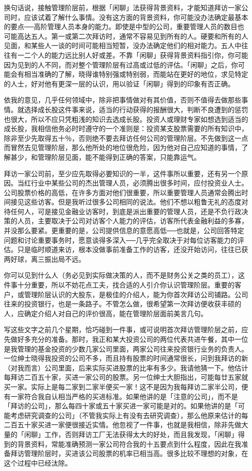 \documentclass[UTF8,a4paper,zihao=-4,fontset = windows]{ctexart} %
\begin{document}
换句话说，接触管理阶层前，根据「闲聊」法获得背景资料，才能知道拜访一家公司时，应该试着了解什么事情。没有这方面的背景资料，你可能没办法确定最基本的要点──高阶管理人员本身的能力。即使是中型的公司，重要管理人员的数目也可能高达五人。第一或第二次拜访时，通常不容易见到所有的人。硬要和所有的人见面，和某些人一谈的时间可能相当短暂，没办法确定他们的相对能力。五人中往往有一二个人的能力远比别人好或差。不靠「闲聊」获得背景资料指引你，你可能因为见到的人不同，而对整个管理阶层有过高或过低的评估。「闲聊」之后，你可能会有相当准确的了解，晓得谁特别强或特别弱，而能站在更好的地位，求见特定的人士，好对他有更深一层的认识，用以验证「闲聊」得到的印象有否正确。

依我的意见，几乎任何领域中，除非把事情做对有其价值，否则不值得去做那些事情。就选择成长股这件事来说，适当的行动获得的报酬很大，判断不良遭到的惩罚也很大，所以不应只凭粗浅的知识去选成长股。投资人或理财专家如想选到适当的成长股，我相信他务必时时遵守的一个准则是：投资某支股票需要的所有知识中，除非至少先取得五十％，否则绝不要去拜访任何公司的管理阶层。不先做到这一点而冒然去见管理阶层，那么他所处的地位很危险，因为他对自己应知道的事情，了解甚少，和管理阶层见面，能不能得到正确的答案，只能靠运气。

拜访一家公司前，至少应先取得必要知识的一半，这件事所以重要，还有另一个原因。当红行业中某些公司的杰出管理人员，必须腾出很多时间，应付投资业人士。公司股票价格的高低，在许多方面对他们很重要，所以重要管理人员通常会腾出时间接见这些访客。但是我听过很多公司相同的说法。他们不想以粗鲁无礼的态度对待任何人，可是接见金融业访客时，到底是派出重要的管理人员，还是不负行政决策的人员，主要取决于公司对访客个人能力的评估，访客所代表金融利益的多寡，并没那么要紧。更重要的是，公司提供信息的意愿高低──也就是，公司回答特定问题和讨论重要事务时，愿意谈得多深入──几乎完全取决于对每位访客能力的评估。只是临时顺道来访，根本没做事前准备工作的访客，还没开始访问，往往已获两好球，离三振出局不远。

你可以见到什么人（务必见到实际做决策的人，而不是财务公关之类的员工），这件事十分重要，所以不妨花点工夫，找合适的人引介你认识管理阶层。重要的客户，或管理阶层认识的大股东，是极佳的介绍人，能为你首次拜访公司铺路。公司往来的投资银行，也是一条路子。不管怎么做，很希望第一次拜访便收获丰硕的人，应确定介绍人对自己的评价很高，能在管理阶层面前美言几句。

写这些文字之前几个星期，恰巧碰到一件事，或可说明首次拜访管理阶层之前，应先做好多充分的准备。那时，我正和某大投资公司的两位代表共进午餐，其中一位是我管理的基金投资的少数几家公司里面，两家公司往来投资银行业务的负责人。一位绅士晓得我投资的公司不多，而且持有股票的时间通常很长，问到我拜访的新（对我而言）公司里面，后来实际买进股票的比率有多少。我请他猜一下。他估计每拜访二百五十家，买进一家公司的股票。另一位绅士大胆指出，可能每廿五家就买一家。实际上是每二家到二家半便买一家！这不是因为我每拜访二家半公司，便有一家符合我自认相当严格的买进标准。如果他讲的是「注意的公司」，而不是「拜访的公司」，那么每四十家或五十家买进一家可能是对的。如果他讲的是「可能考虑研究调查的公司」（不管我实际上有没有去研究调查），那么他原来估计的每二百五十家买进一家便很接近实情。他忽视了一件事，也就是我相信，除非先做大量的「闲聊」工作，否则拜访工厂无法获得太大的好处，而且我发现，「闲聊」得到的背景资料，常能准确预测一家公司符合我的十五要点到什么程度，因此在我准备拜访管理阶层时，买进该公司股票的机率已相当高。很多比较不理想的对象，在这个过程中已经汰除。
\end{document}

